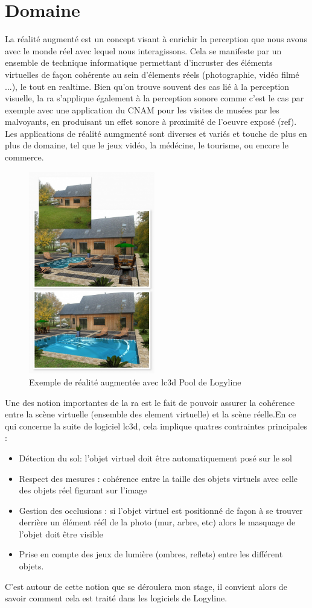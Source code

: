 \section{Domaine}

La réalité augmenté est un concept visant à enrichir la perception que nous avons avec le monde réel avec lequel nous interagissons. Cela se manifeste par un ensemble de technique informatique permettant d'incruster des éléments virtuelles de façon cohérente au sein d'élements réels (photographie, vidéo filmé ...), le tout en \gls{realtime}. 
Bien qu'on trouve souvent des cas lié à la perception visuelle, la \gls{ra} s'applique également à la perception sonore comme c'est le cas par exemple avec une application du CNAM pour les visites
de musées par les malvoyants, en produisant un effet sonore à proximité de l'oeuvre exposé (ref). Les applications de réalité aumgmenté sont diverses et variés et touche de plus en plus de domaine, tel que le jeux vidéo, la médécine, le tourisme, ou encore le commerce.

\begin{figure}[!ht]
\centering
\includegraphics[width = 5.5cm] {images/exempleLC3DPool.jpg} 
\caption{Exemple de réalité augmentée avec \gls{lc3d} Pool de Logyline}
\label{fig:exempleRA}
\end{figure}

Une des notion importantes de la \gls{ra} est le fait de pouvoir assurer la cohérence entre la scène virtuelle (ensemble des element virtuelle) et la scène réelle.En ce qui concerne la suite de logiciel \gls{lc3d}, cela implique quatres contraintes principales :

\begin{itemize}
    \item Détection du sol: l'objet virtuel doit être automatiquement posé sur le sol
    \item Respect des mesures : cohérence entre la taille des objets virtuels avec celle des objets réel figurant sur l'image 
    \item Gestion des occlusions : si l'objet virtuel est positionné de façon à se trouver derrière un élément réél de la photo (mur, arbre, etc) alors le masquage de l'objet doit être visible
    \item Prise en compte des jeux de lumière (ombres, reflets) entre les différent objets.
\end{itemize}

C'est autour de cette notion que se déroulera mon stage, il convient alors de savoir comment cela est traité dans les logiciels de Logyline. 